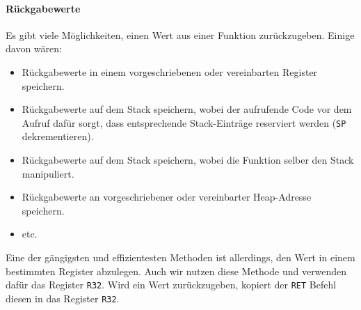 \paragraph{Rückgabewerte}
Es gibt viele Möglichkeiten, einen Wert aus einer Funktion zurückzugeben.
Einige davon wären:
\begin{itemize}
 \item Rückgabewerte in einem vorgeschriebenen oder vereinbarten Register speichern.
 \item Rückgabewerte auf dem Stack speichern, wobei der aufrufende Code vor dem Aufruf
       dafür sorgt, dass entsprechende Stack-Einträge reserviert werden
       (\texttt{SP} dekrementieren).
 \item Rückgabewerte auf dem Stack speichern, wobei die Funktion selber den Stack
       manipuliert.
 \item Rückgabewerte an vorgeschriebener oder vereinbarter Heap-Adresse speichern.
 \item etc.
\end{itemize}

Eine der gängigsten und effizientesten Methoden ist allerdings, den Wert in
einem bestimmten Register abzulegen. Auch wir nutzen diese Methode und verwenden
dafür das Register \texttt{R32}. Wird ein Wert zurückzugeben, kopiert der
\texttt{RET} Befehl diesen in das Register \texttt{R32}.

%
%

